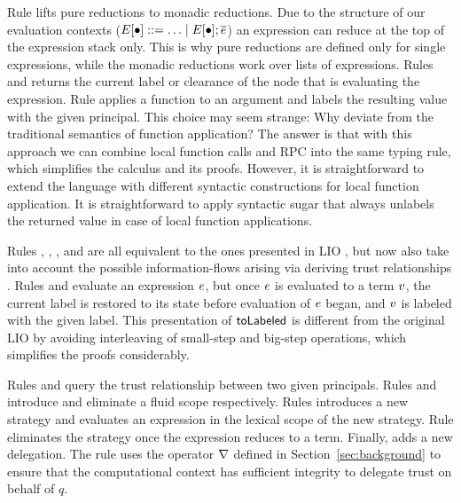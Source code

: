 Rule  lifts pure reductions to monadic reductions. Due to the structure of our evaluation contexts ($E \lbrack \bullet \rbrack ::= \ldots \mid E \lbrack \bullet \rbrack ; \overline{e}$) an expression can reduce at the top of the expression stack only. This is why pure reductions are defined only for single expressions, while the monadic reductions work over lists of expressions. Rules  and  returns the current label or clearance of the node that is evaluating the expression. Rule  applies a function to an argument and labels the resulting value with the given principal. This choice may seem strange: Why deviate from the traditional semantics of function application? The answer is that with this approach we can combine local function calls and RPC into the same typing rule, which simplifies the calculus and its proofs. However, it is straightforward to extend the language with different syntactic constructions for local function application. It is straightforward to apply syntactic sugar that always unlabels the returned value in case of local function applications.

Rules , , ,  and  are all equivalent to the ones presented in LIO \cite{SRMMlio}, but now also take into account the possible information-flows arising via deriving trust relationships \cite{Arden:2015:FA:2859845.2859998}. Rules  and  evaluate an expression $e$, but once $e$ is evaluated to a term $v$, the current label is restored to its state before evaluation of $e$ began, and $v$ is labeled with the given label. This presentation of $\mathsf{toLabeled}$ is different from the original LIO \cite{SRMMlio} by avoiding interleaving of small-step and big-step operations, which simplifies the proofs considerably.

Rules  and  query the trust relationship between two given principals. Rules  and  introduce and eliminate a fluid scope respectively. Rules  introduces a new strategy and evaluates an expression in the lexical scope of the new strategy. Rule  eliminates the strategy once the expression reduces to a term. Finally,  adds a new delegation. The rule uses the operator $\nabla$ defined in Section~\ref{sec:background} to ensure that the computational context has sufficient integrity to delegate trust on behalf of $q$.

